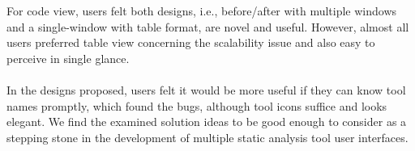 For code view, users felt both designs, i.e., before/after with multiple windows and a single-window with table format, are novel and useful. However, almost all users preferred table view concerning the scalability issue and also easy to perceive in single glance. \\ \\

In the designs proposed, users felt it would be more useful if they can know tool names promptly, which found the bugs, although tool icons suffice and looks elegant. We find the examined solution ideas to be good enough to consider as a stepping stone in the development of multiple static analysis tool user interfaces. \\

\let\cleardoublepage\clearpage